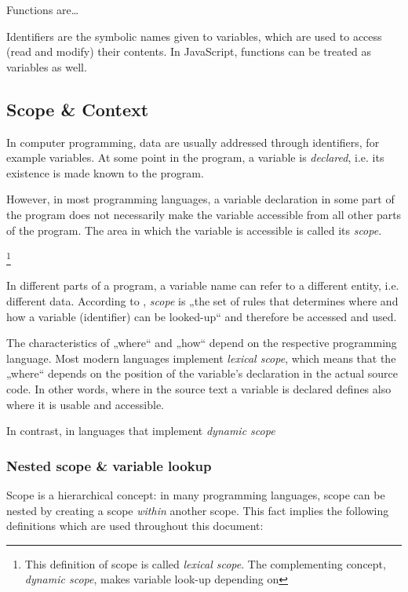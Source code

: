 Functions are\ldots{}

Identifiers are the symbolic names given to variables, which are used to
access (read and modify) their contents. In JavaScript, functions can be
treated as variables as well.

\subsection{Scope \& Context}\label{scope-context}

In computer programming, data are usually addressed through identifiers,
for example variables. At some point in the program, a variable is
\emph{declared}, i.e. its existence is made known to the program.

However, in most programming languages, a variable declaration in some
part of the program does not necessarily make the variable accessible
from all other parts of the program. The area in which the variable is
accessible is called its \emph{scope}.

\footnote{This definition of scope is called \emph{lexical scope}. The
  complementing concept, \emph{dynamic scope}, makes variable look-up
  depending on}

In different parts of a program, a variable name can refer to a
different entity, i.e. different data. According to ,
\emph{scope} is „the set of rules that determines where and how a
variable (identifier) can be looked-up“ and therefore be accessed and
used.

The characteristics of „where“ and „how“ depend on the respective
programming language. Most modern languages implement \emph{lexical
scope}, which means that the „where“ depends on the position of the
variable’s declaration in the actual source code. In other words, where
in the source text a variable is declared defines also where it is
usable and accessible.

In contrast, in languages that implement \emph{dynamic scope}

\subsubsection{Nested scope \& variable
lookup}\label{nested-scope-variable-lookup}

Scope is a hierarchical concept: in many programming languages, scope
can be nested by creating a scope \emph{within} another scope. This fact
implies the following definitions which are used throughout this
document:

